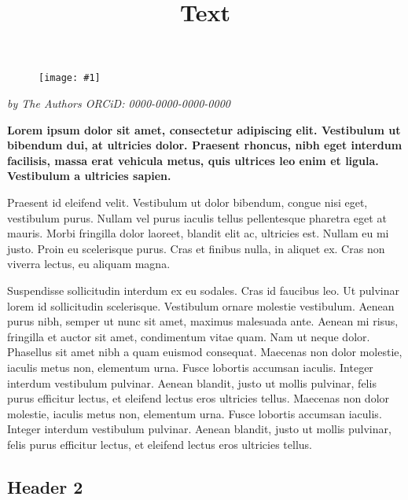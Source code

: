\documentclass{article}
\newlength{\imgwidth}
\newcommand\scaledgraphics[2]{%
                
\settowidth{\imgwidth}{\texttt{[image: \#1]}}%
                
\setlength{\imgwidth}{\minof{\imgwidth}{#2\textwidth}}%
                
\texttt{[image: \#1]}%
                
}
\begin{document}
\title{Text}

\maketitle

\begin{figure}
\scaledgraphics{45ff9ba7-23db-4aef-8e66-5b46cab0740e.png}{1}
\label{F46825101}
\end{figure}


\emph{by The Authors ORCiD: 0000-0000-0000-0000}


\textbf{Lorem ipsum dolor sit amet, consectetur adipiscing elit. Vestibulum ut bibendum dui, at ultricies dolor. Praesent rhoncus, nibh eget interdum facilisis, massa erat vehicula metus, quis ultrices leo enim et ligula. Vestibulum a ultricies sapien.} 


Praesent id eleifend velit. Vestibulum ut dolor bibendum, congue nisi eget, vestibulum purus. Nullam vel purus iaculis tellus pellentesque pharetra eget at mauris.\autocite{gesis-ssoar-68697} Morbi fringilla dolor laoreet, blandit elit ac, ultricies est. Nullam eu mi justo. Proin eu scelerisque purus. Cras et finibus nulla, in aliquet ex. Cras non viverra lectus, eu aliquam magna.\autocite{gesis-ssoar-62624}


Suspendisse sollicitudin interdum ex eu sodales.\autocite{gesis-ssoar-70027} Cras id faucibus leo. Ut pulvinar lorem id sollicitudin scelerisque. Vestibulum ornare molestie vestibulum. Aenean purus nibh, semper ut nunc sit amet, maximus malesuada ante. Aenean mi risus, fringilla et auctor sit amet, condimentum vitae quam. Nam ut neque dolor.\autocite{https://doi.org/10.5281/zenodo.7809805} Phasellus sit amet nibh a quam euismod consequat. Maecenas non dolor molestie, iaculis metus non, elementum urna. Fusce lobortis accumsan iaculis. Integer interdum vestibulum pulvinar. Aenean blandit, justo ut mollis pulvinar, felis purus efficitur lectus, et eleifend lectus eros ultricies tellus. Maecenas non dolor molestie, iaculis metus non, elementum urna. Fusce lobortis accumsan iaculis. Integer interdum vestibulum pulvinar. Aenean blandit, justo ut mollis pulvinar, felis purus efficitur lectus, et eleifend lectus eros ultricies tellus.


\subsection{Header 2}\label{H3719843}
\end{document}
